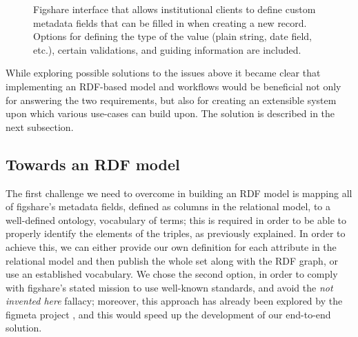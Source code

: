 \begin{enumerate}
\begin{figure}[thpb]
  \centering
  \caption{Figshare interface that allows institutional clients to define custom metadata fields that can be filled in when creating a new record. Options for defining the type of the value (plain string, date field, etc.), certain validations, and guiding information are included.}
  \label{fig:caf}
\end{figure}

\end{enumerate}

While exploring possible solutions to the issues above it became clear that implementing an RDF-based model and workflows would be beneficial not only for answering the two requirements, but also for creating an extensible system upon which various use-cases can build upon. The solution is described in the next subsection.


\subsection{Towards an RDF model}
\label{sec:rdf}

The first challenge we need to overcome in building an RDF model is mapping all of figshare's metadata fields, defined as columns in the relational model, to a well-defined ontology, vocabulary of terms; this is required in order to
be able to properly identify the elements of the triples, as previously explained. In order to achieve this, we can either provide our own definition for each attribute in the relational model and then publish the whole set along with the RDF graph, or use an established vocabulary. We chose the second option, in order to comply with figshare's stated mission to use well-known standards, and avoid the \emph{not invented here} fallacy; moreover, this approach has already been explored by the figmeta project \cite{figmeta}, and this would speed up the development of our end-to-end solution.

